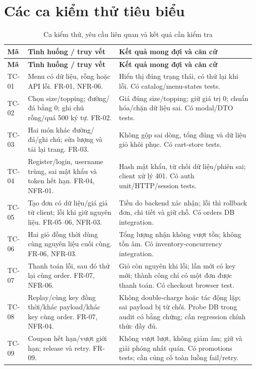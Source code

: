 \section{Các ca kiểm thử tiêu biểu}
{\small{}
\begin{longtable}{@{}L{0.10\textwidth}L{0.39\textwidth}L{0.44\textwidth}@{}}
\caption{Ca kiểm thử, yêu cầu liên quan và kết quả cần kiểm tra}\label{tab:testcases}\\
\toprule\textbf{Mã} & \textbf{Tình huống / truy vết} & \textbf{Kết quả mong đợi và căn cứ} \\\midrule\endfirsthead
\toprule\textbf{Mã} & \textbf{Tình huống / truy vết} & \textbf{Kết quả mong đợi và căn cứ} \\\midrule\endhead
\bottomrule\endfoot
TC-01 & Menu có dữ liệu, rỗng hoặc API lỗi. FR-01, NFR-06. & Hiển thị đúng trạng thái, có thử lại khi lỗi. Có catalog/menu-states tests. \\
TC-02 & Chọn size/topping; đường/đá bằng 0; ghi chú rỗng/quá 500 ký tự. FR-02. & Giá đúng size/topping; giữ giá trị 0; chuẩn hóa/chặn dữ liệu sai. Có modal/DTO tests. \\
TC-03 & Hai món khác đường/đá/ghi chú; sửa lượng và tải lại trang. FR-03. & Không gộp sai dòng, tổng đúng và dữ liệu giỏ khôi phục. Có cart-store tests. \\
TC-04 & Register/login, username trùng, sai mật khẩu và token hết hạn. FR-04, NFR-01. & Hash mật khẩu, từ chối dữ liệu/phiên sai; client xử lý 401. Có auth unit/HTTP/session tests. \\
TC-05 & Tạo đơn có dữ liệu/giá giả từ client; lỗi khi giữ nguyên liệu. FR-05--06, NFR-03. & Tiền do backend xác nhận; lỗi thì rollback đơn, chi tiết và giữ chỗ. Có orders DB integration. \\
TC-06 & Hai giỏ đồng thời dùng cùng nguyên liệu cuối cùng. FR-06, NFR-03. & Tổng lượng nhận không vượt tồn; không tồn âm. Có inventory-concurrency integration. \\
TC-07 & Thanh toán lỗi, sau đó thử lại cùng order. FR-07, NFR-06. & Giỏ còn nguyên khi lỗi; lần mới có key mới; thành công chỉ có một đơn được thanh toán. Có checkout browser test. \\
TC-08 & Replay/cùng key đồng thời/khác payload/khác key cùng order. FR-07, NFR-04. & Không double-charge hoặc tác động lặp; sai payload bị từ chối. Probe DB trong audit có bằng chứng; cần regression chính thức đầy đủ. \\
TC-09 & Coupon hết hạn/vượt giới hạn; release và retry. FR-09. & Không vượt lượt, không giảm âm; giữ và giải phóng nhất quán. Có promotions tests; cần củng cố toàn luồng fail/retry. \\

\end{longtable}}
